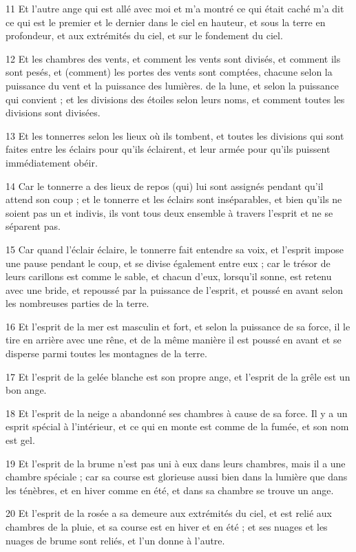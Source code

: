 \par 11 Et l'autre ange qui est allé avec moi et m'a montré ce qui était caché m'a dit ce qui est le premier et le dernier dans le ciel en hauteur, et sous la terre en profondeur, et aux extrémités du ciel, et sur le fondement du ciel.
\par 12 Et les chambres des vents, et comment les vents sont divisés, et comment ils sont pesés, et (comment) les portes des vents sont comptées, chacune selon la puissance du vent et la puissance des lumières. de la lune, et selon la puissance qui convient ; et les divisions des étoiles selon leurs noms, et comment toutes les divisions sont divisées.
\par 13 Et les tonnerres selon les lieux où ils tombent, et toutes les divisions qui sont faites entre les éclairs pour qu'ils éclairent, et leur armée pour qu'ils puissent immédiatement obéir.
\par 14 Car le tonnerre a des lieux de repos (qui) lui sont assignés pendant qu'il attend son coup ; et le tonnerre et les éclairs sont inséparables, et bien qu'ils ne soient pas un et indivis, ils vont tous deux ensemble à travers l'esprit et ne se séparent pas.
\par 15 Car quand l'éclair éclaire, le tonnerre fait entendre sa voix, et l'esprit impose une pause pendant le coup, et se divise également entre eux ; car le trésor de leurs carillons est comme le sable, et chacun d'eux, lorsqu'il sonne, est retenu avec une bride, et repoussé par la puissance de l'esprit, et poussé en avant selon les nombreuses parties de la terre.
\par 16 Et l'esprit de la mer est masculin et fort, et selon la puissance de sa force, il le tire en arrière avec une rêne, et de la même manière il est poussé en avant et se disperse parmi toutes les montagnes de la terre.
\par 17 Et l'esprit de la gelée blanche est son propre ange, et l'esprit de la grêle est un bon ange.
\par 18 Et l'esprit de la neige a abandonné ses chambres à cause de sa force. Il y a un esprit spécial à l'intérieur, et ce qui en monte est comme de la fumée, et son nom est gel.
\par 19 Et l'esprit de la brume n'est pas uni à eux dans leurs chambres, mais il a une chambre spéciale ; car sa course est glorieuse aussi bien dans la lumière que dans les ténèbres, et en hiver comme en été, et dans sa chambre se trouve un ange.
\par 20 Et l'esprit de la rosée a sa demeure aux extrémités du ciel, et est relié aux chambres de la pluie, et sa course est en hiver et en été ; et ses nuages ​​et les nuages ​​de brume sont reliés, et l'un donne à l'autre.
